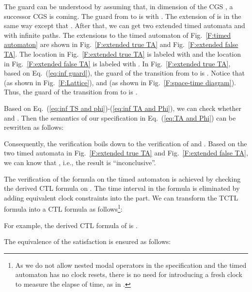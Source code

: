 \documentclass[10pt,conference,compsocconf,letterpaper]{IEEEtran}
\begin{document}
The guard can be understood by assuming that, in dimension  of the CGS , a successor CGS  is coming. The guard from  to  is  with . The extension of  is in the same way except that . After that, we can get two extended timed automata  and  with infinite paths. The extensions to the timed automaton of Fig.~\ref{F:timed automaton} are shown in Fig.~\ref{F:extended true TA} and Fig.~\ref{F:extended false TA}. The location  in Fig.~\ref{F:extended true TA} is labeled with  and the location  in Fig.~\ref{F:extended false TA} is labeled with . In Fig.~\ref{F:extended true TA}, based on Eq.~(\ref{eq:inf guard}), the guard of the transition from  to  is . Notice that  (as shown in Fig.~\ref{F:Lattice}), and  (as shown in Fig.~\ref{F:space-time diagram}). Thus, the guard of the transition from  to  is .

Based on Eq.~(\ref{eq:inf TS and phi})-(\ref{eq:inf TA and Phi}), we can check whether  and . Then the semantics of our specification in Eq.~(\ref{eq:TA and Phi}) can be rewritten as follows:

Consequently, the verification boils down to the verification of  and . Based on the two timed automata in Fig.~\ref{F:extended true TA} and Fig.~\ref{F:extended false TA}, we can know that , i.e., the result is ``inconclusive''.

The verification of the formula  on the timed automaton  is achieved by checking the derived CTL formula  on  \cite{Baier08}. The time interval  in the formula  is eliminated by adding equivalent clock constraints into the  part. We can transform the TCTL formula  into a CTL formula  as follows\footnote{As we do not allow nested modal operators in the specification and the timed automaton has no clock resets, there is no need for introducing a fresh clock to measure the elapse of time, as in \cite{Baier08}.}:
\iffalse

\fi

For example, the derived CTL formula of  is .

The equivalence of the satisfaction is ensured as follows:
\end{document}
